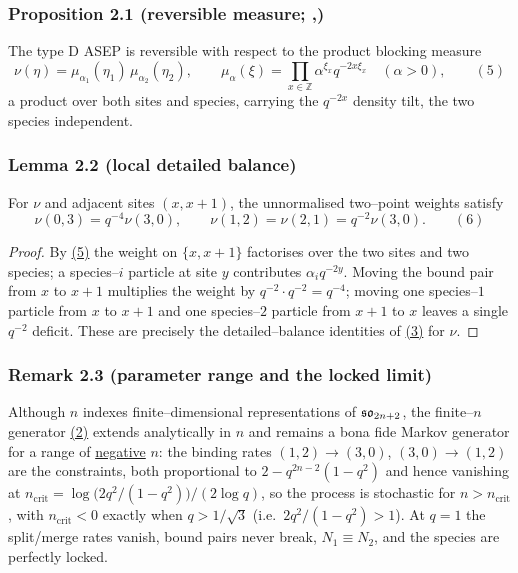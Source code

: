 \documentclass[11pt]{article}
\theoremstyle{plain}
\theoremstyle{definition}
\theoremstyle{remark}
\newcommand{\Z}{\mathbb{Z}}\newcommand{\R}{\mathbb{R}}\newcommand{\N}{\mathbb{N}}
\begin{document}
\subsubsection{Proposition 2.1 (reversible measure; {\cite[Prop.~1.3]{KLLPZ}},{\cite[\S3.1]{REU}})}\label{prop_measure}

The type D ASEP is reversible with respect to the product blocking measure
\label{eq_nu}
\begin{equation}
  \nu(\eta)=\mu_{\alpha_1}(\eta_1)\,\mu_{\alpha_2}(\eta_2),\qquad
  \mu_\alpha(\xi)=\prod_{x\in\Z}\alpha^{\xi_x}q^{-2x\xi_x}\quad(\alpha>0),\qquad(5)
\end{equation}
a product over both sites and species, carrying the $q^{-2x}$ density tilt, the two
species independent.
\par

\subsubsection{Lemma 2.2 (local detailed balance)}\label{lem_db}

For $\nu$ and adjacent sites $(x,x+1)$, the unnormalised two--point weights satisfy
\label{eq_dbrel}
\begin{equation}
  \nu(0,3)=q^{-4}\nu(3,0),\qquad \nu(1,2)=\nu(2,1)=q^{-2}\nu(3,0).\qquad(6)
\end{equation}
\par
\begin{proof}
By \hyperref[eq_nu]{(5)} the weight on $\{x,x+1\}$ factorises over the two sites and two
species; a species--$i$ particle at site $y$ contributes $\alpha_i q^{-2y}$. Moving the
bound pair from $x$ to $x+1$ multiplies the weight by $q^{-2}\cdot q^{-2}=q^{-4}$;
moving one species--$1$ particle from $x$ to $x+1$ and one species--$2$ particle from
$x+1$ to $x$ leaves a single $q^{-2}$ deficit. These are precisely the
detailed--balance identities of \hyperref[eq_rates]{(3)} for $\nu$.
\end{proof}

\subsubsection{Remark 2.3 (parameter range and the locked limit)}\label{rem_range}

Although $n$ indexes finite--dimensional representations of $\mathfrak{so}_{2n+2}$, the
finite--$n$ generator \hyperref[eq_nrates]{(2)} extends analytically in $n$ and remains a
bona fide Markov generator for a range of \underline{negative} $n$: the binding rates
$(1,2)\to(3,0)$, $(3,0)\to(1,2)$ are the constraints, both proportional to
$2-q^{2n-2}(1-q^2)$ and hence vanishing at
$n_{\mathrm{crit}}=\log\!\big(2q^2/(1-q^2)\big)/(2\log q)$, so the process is stochastic
for $n>n_{\mathrm{crit}}$, with $n_{\mathrm{crit}}<0$ exactly when $q>1/\sqrt3$ (i.e.\
$2q^2/(1-q^2)>1$). At
$q=1$ the split/merge rates vanish, bound pairs never break, $N_1\equiv N_2$, and the
species are perfectly locked.
\par
\end{document}
